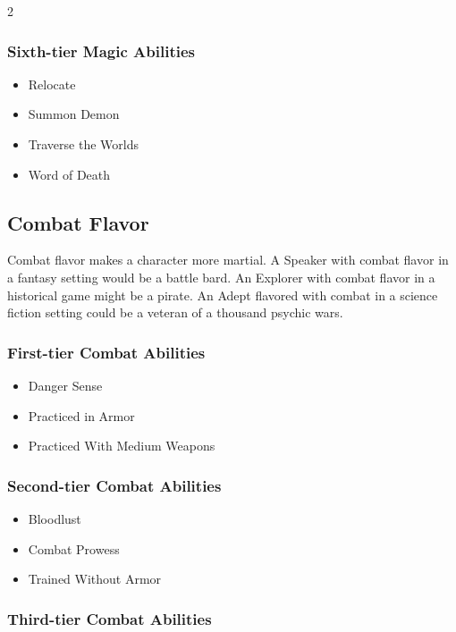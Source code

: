 \begin{multicols}{2}
\subsubsection{Sixth-tier Magic Abilities}

\begin{itemize}
\item Relocate
\item Summon Demon
\item Traverse the Worlds
\item Word of Death
\end{itemize}

\subsection{Combat Flavor}

Combat flavor makes a character more martial. A Speaker with combat flavor in a fantasy setting would be a battle bard. An Explorer with combat flavor in a historical game might be a pirate. An Adept flavored with combat in a science fiction setting could be a veteran of a thousand psychic wars.

\subsubsection{First-tier Combat Abilities}

\begin{itemize} 
\item Danger Sense
\item Practiced in Armor
\item Practiced With Medium Weapons
\end{itemize}


\subsubsection{Second-tier Combat Abilities}

\begin{itemize}
\item Bloodlust
\item Combat Prowess
\item Trained Without Armor
\end{itemize}

\subsubsection{Third-tier Combat Abilities}


\end{multicols}
